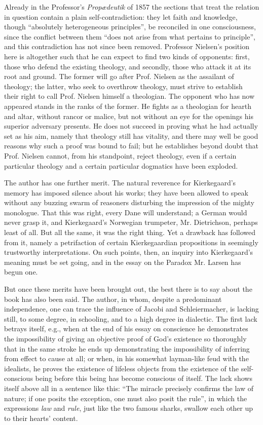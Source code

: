 \documentclass[12pt,a4paper,openany]{book}
\newcommand{\opage}[1]{\marginnote{\footnotesize\textit{[#1]}}}
\begin{document}
Already in the Professor's \emph{Propædeutik} of 1857 the sections that
treat the relation in question contain a plain self-contradiction: they
let faith and knowledge, though ``absolutely heterogeneous principles'',
be reconciled in one consciousness, since the conflict between them
``does not arise from what pertains to principle'', and this
contradiction has not since been removed. Professor Nielsen's position
here is altogether such that he can expect to find two kinds of opponents:
first, those who defend the existing theology, and
\opage{9}secondly, those who attack it at its root and ground. The former
will go after Prof. Nielsen as the assailant of theology; the latter,
who seek to overthrow theology, must strive to establish their right to
call Prof. Nielsen himself a theologian. The opponent who has now
appeared stands in the ranks of the former. He fights as a theologian for
hearth and altar, without rancor or malice, but not without an eye for
the openings his superior adversary presents. He does not succeed in
proving what he had actually set as his aim, namely that theology still
has vitality, and there may well be good reasons why such a proof was
bound to fail; but he establishes beyond doubt that Prof. Nielsen cannot,
from his standpoint, reject theology, even if a certain particular
theology and a certain particular dogmatics have been exploded.

The author has one further merit. The natural reverence for Kierkegaard's
memory has imposed silence about his works; they have been allowed to
speak without any buzzing swarm of reasoners disturbing the impression of
the mighty monologue. That this was right, every Dane will understand; a
German would never grasp it, and Kierkegaard's Norwegian trumpeter,
Mr. Dietrichson, perhaps least of all. But all the same, it was the right
thing. Yet a drawback has followed from it, namely a petrifaction of
certain Kierkegaardian propositions in seemingly trustworthy
interpretations. On such points, then, an inquiry into Kierkegaard's
meaning must be set going, and in the essay on the Paradox Mr. Larsen has
begun one.

But once these merits have been brought out, the best there is to say
about the book has also been said. The author, in whom, despite a
predominant independence, one can trace the influence of Jacobi and
Schleiermacher, is lacking still, to some degree, in schooling, and to a
high degree in dialectic. The first lack betrays itself, e.g., when at the
end of his essay on conscience he demonstrates the impossibility of
giving an objective proof of God's existence so thoroughly that in the
same stroke he ends up demonstrating the impossibility of inferring from
effect to cause at all; or when, in his somewhat layman-like feud with the
idealists, he proves the existence of lifeless objects from the existence
of the self-conscious being before this being has become conscious of
itself. The lack shows itself above all in a sentence like this: ``The
miracle precisely confirms the law of nature; if one posits the exception,
one must also posit the rule'', in which the expressions \emph{law} and
\emph{rule},
\opage{10}just like the two famous sharks, swallow each other up to their
hearts' content.
\end{document}
